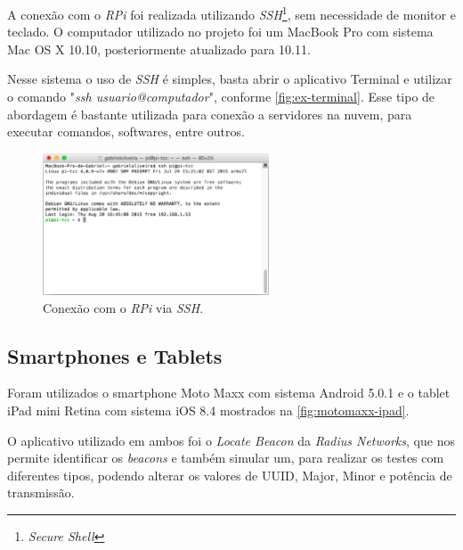 A conexão com o \textit{RPi} foi realizada utilizando \textit{SSH}\footnote{\textit{Secure Shell}}, sem necessidade de monitor e teclado. O computador utilizado no projeto foi um MacBook Pro com sistema Mac OS X 10.10, posteriormente atualizado para 10.11. 

Nesse sistema o uso de \textit{SSH} é simples, basta abrir o aplicativo Terminal e utilizar o comando "\textit{ssh usuario@computador}", conforme \autoref{fig:ex-terminal}. Esse tipo de abordagem é bastante utilizada para conexão a servidores na nuvem, para executar comandos, softwares, entre outros.

\begin{figure}[htb]
	\caption{\label{fig:ex-terminal}Conexão com o \textit{RPi} via \textit{SSH}.}
	\begin{center}
		\includegraphics[width=0.6\textwidth]{img/terminal-pi.png}
	\end{center}
\end{figure}

\subsection{Smartphones e Tablets}\label{sec:smartphone-tablets}

Foram utilizados o smartphone Moto Maxx com sistema Android 5.0.1 e o tablet iPad mini Retina com sistema iOS 8.4 mostrados na \autoref{fig:motomaxx-ipad}. 

O aplicativo utilizado em ambos foi o \textit{Locate Beacon} da \textit{Radius Networks}, que nos permite identificar os \textit{beacons} e também simular um, para realizar os testes com diferentes tipos, podendo alterar os valores de UUID, Major, Minor e potência de transmissão. 

